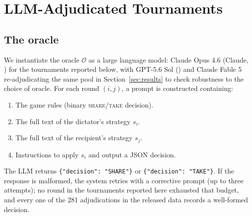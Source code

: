 \documentclass[11pt]{article}
\begin{document}
\section{LLM-Adjudicated Tournaments}
\label{sec:tournament}

\subsection{The oracle}

We instantiate the oracle $\mathcal{O}$ as a large language model:
Claude Opus 4.6 (Claude, \citealt{anthropic2025claude}) for the
tournaments reported below, with GPT-5.6 Sol
(\citealt{openai2026gpt}) and Claude Fable 5 re-adjudicating the
same pool in Section~\ref{sec:results} to check robustness to the
choice of oracle.
For each round $(i, j)$, a prompt is constructed containing:
\begin{enumerate}
  \item The game rules (binary
    \textup{\textsc{share}}/\textup{\textsc{take}} decision).
  \item The full text of the dictator's strategy $s_i$.
  \item The full text of the recipient's strategy $s_j$.
  \item Instructions to apply $s_i$ and output a JSON decision.
\end{enumerate}

The LLM returns
\texttt{\{"decision": "SHARE"\}} or \texttt{\{"decision": "TAKE"\}}.
If the response is malformed, the system retries with a corrective
prompt (up to three attempts); no round in the tournaments reported
here exhausted that budget, and every one of the 281 adjudications
in the released data records a well-formed decision.

\end{document}
